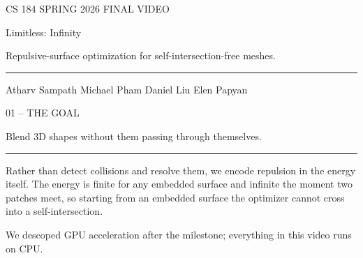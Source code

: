 \documentclass[aspectratio=169,14pt]{beamer}
\newcommand{\decklabel}[1]{%
  {\fontsize{8.5}{11}\selectfont\color{Label}\MakeUppercase{#1}\par}%
}
\newcommand{\slidetitle}[1]{%
  {\fontsize{25}{30}\selectfont\color{Text}\raggedright #1\par}%
}
\newcommand{\slidebody}[1]{%
  {\fontsize{12.2}{15.4}\selectfont\color{Dim}\raggedright #1\par}%
}
\newcommand{\thinrule}{%
  \par\vspace{0.24cm}%
  {\color{Rule}\rule{2.45cm}{0.35pt}}%
  \par\vspace{0.25cm}%
}
\begin{document}
\begin{frame}[plain]
  \vspace*{0.72cm}
  \hspace*{1.22cm}
  \begin{minipage}{0.82\paperwidth}
    \raggedright
    \decklabel{CS 184 \textperiodcentered{} Spring 2026 \textperiodcentered{} Final Video}
    \vspace{0.62cm}

    {\fontsize{37}{44}\selectfont\color{Text}Limitless: Infinity\par}
    \vspace{0.25cm}
    {\fontsize{15.6}{20}\selectfont\color{Dim}Repulsive-surface optimization for self-intersection-free meshes.\par}
    \vspace{0.46cm}
    \textcolor{Rule}{\rule{2.45cm}{0.35pt}}
    \vspace{0.26cm}

    {\fontsize{9.5}{12}\selectfont\color{Label}
    Atharv Sampath \quad \textperiodcentered{} \quad Michael Pham
    \quad \textperiodcentered{} \quad Daniel Liu
    \quad \textperiodcentered{} \quad Elen Papyan\par}
  \end{minipage}
\end{frame}

\begin{frame}[plain]
  \vspace*{0.82cm}
  \hspace*{1.22cm}
  \begin{minipage}{0.78\paperwidth}
  \raggedright
  \decklabel{01 -- The goal}
  \vspace{0.54cm}
  \slidetitle{Blend 3D shapes without them passing through themselves.}
  \thinrule
  \slidebody{Rather than detect collisions and resolve them, we encode repulsion in the energy itself. The energy is finite for any embedded surface and infinite the moment two patches meet, so starting from an embedded surface the optimizer cannot cross into a self-intersection.}
  \vspace{0.30cm}
  \slidebody{We descoped GPU acceleration after the milestone; everything in this video runs on CPU.}
  \end{minipage}
\end{frame}
\end{document}
